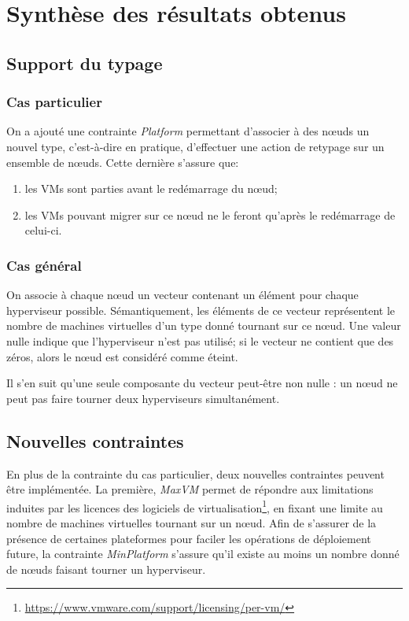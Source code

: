 \documentclass[a4paper]{article}
\begin{document}
\section{Synthèse des résultats obtenus}
\subsection{Support du typage}
\subsubsection{Cas particulier}
On a ajouté une contrainte \textit{Platform} permettant d'associer à
des nœuds un nouvel type, c'est-à-dire en pratique, d'effectuer une
action de retypage sur un ensemble de nœuds. Cette dernière s'assure que:
\begin{enumerate}
	\item les VMs sont parties avant le redémarrage du nœud;
	\item les VMs pouvant migrer sur ce nœud ne le feront qu'après le
		redémarrage de celui-ci.
\end{enumerate}
\subsubsection{Cas général}
On associe à chaque nœud un vecteur contenant un élément pour
chaque hyperviseur possible. Sémantiquement, les éléments de ce
vecteur représentent le nombre de machines virtuelles d'un type donné
tournant sur ce nœud. Une valeur nulle indique que l'hyperviseur
n'est pas utilisé; si le vecteur ne contient que des zéros, alors
le nœud est considéré comme éteint.

Il s'en suit qu'une seule composante du vecteur peut-être non nulle :
un nœud ne peut pas faire tourner deux hyperviseurs simultanément.

\subsection{Nouvelles contraintes}
En plus de la contrainte du cas particulier, deux nouvelles
contraintes peuvent être implémentée. La première, \textit{MaxVM}
permet de répondre aux limitations induites par les licences des logiciels de
virtualisation\footnote{\url{https://www.vmware.com/support/licensing/per-vm/}},
en fixant une limite au nombre de machines virtuelles
tournant sur un nœud. Afin de s'assurer de
la présence de certaines plateformes pour faciler les opérations de
déploiement future, la contrainte \textit{MinPlatform} s'assure qu'il
existe au moins un nombre donné de nœuds faisant tourner un hyperviseur.
\end{document}
